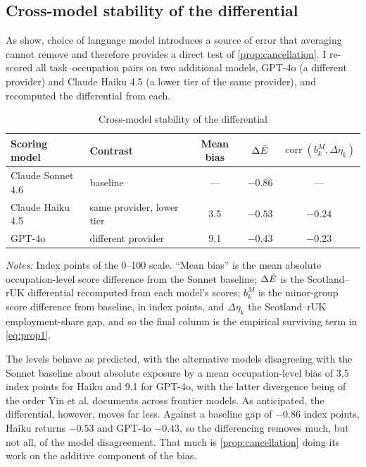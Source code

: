 \subsection{Cross-model stability of the differential}\label{sec:crossmodel}
 
As \citet{yin2026} show, choice of language model introduces a source of error that averaging cannot remove and therefore provides a direct test of \cref{prop:cancellation}. I re-scored all task--occupation pairs on two additional models, GPT-4o (a different provider) and Claude Haiku 4.5 (a lower tier of the same provider), and recomputed the differential from each.
 
\begin{table}[t]
\centering
\caption{Cross-model stability of the differential}
\label{tab:crossmodel}
\small
\begin{tabular}{llccc}
\toprule
Scoring model & Contrast & Mean bias & $\Delta\bar{E}$ &
$\operatorname{corr}(b^{M}_k, \Delta\eta_k)$ \\
\midrule
Claude Sonnet 4.6 & baseline                   & --- & $-0.86$ & --- \\
Claude Haiku 4.5  & same provider, lower tier  & 3.5 & $-0.53$ & $-0.24$ \\
GPT-4o            & different provider         & 9.1 & $-0.43$ & $-0.23$ \\
\bottomrule
\end{tabular}
\begin{minipage}{0.92\textwidth}
\vspace{0.4em}\footnotesize
\textit{Notes:} Index points of the 0--100 scale. ``Mean bias'' is the mean absolute occupation-level score difference from the Sonnet baseline; $\Delta\bar{E}$ is the Scotland--rUK differential recomputed from each model's scores; $b^{M}_k$ is the minor-group score difference from baseline, in index points, and $\Delta\eta_k$ the Scotland--rUK employment-share gap, and so the final column is the empirical surviving term in \cref{eq:prop1}.
\end{minipage}
\end{table}
 
The levels behave as predicted, with the alternative models disagreeing with the Sonnet baseline about absolute exposure by a mean occupation-level bias of 3.5 index points for Haiku and 9.1 for GPT-4o, with the latter divergence being of the order Yin et al. documents across frontier models. As anticipated, the differential, however, moves far less. Against a baseline gap of $-0.86$ index points, Haiku returns $-0.53$ and GPT-4o $-0.43$, so the differencing removes much, but not all, of the model disagreement. That much is \cref{prop:cancellation} doing its work on the additive component of the bias.

